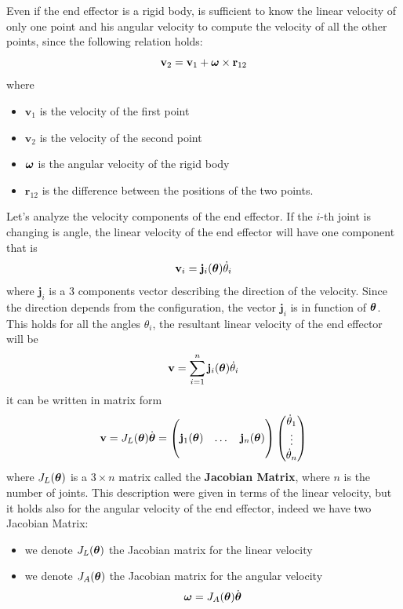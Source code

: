 \documentclass[10pt, letterpaper]{report}
\begin{document}
Even if the end effector is a rigid body, is sufficient to know the linear velocity of only one point and his angular velocity to compute the velocity of all the other points, since the following relation holds:\begin{equation}
    \mathbf v_2 = \mathbf v_1+{\boldsymbol{\omega}}\times \mathbf r_{12}
\end{equation}
where\begin{itemize}
    \item $\mathbf v_1$ is the velocity of the first point
    \item $\mathbf v_2$ is the velocity of the second point
    \item ${\boldsymbol{\omega}}$ is the angular velocity of the rigid body
    \item $\mathbf r_{12}$ is the difference between the positions of the two points.
\end{itemize}
Let's analyze the velocity components of the end effector. If the $i$-th joint is changing is angle, the linear velocity of the end effector will have one component that is\begin{equation}
    \mathbf v_i=\mathbf j_i({\boldsymbol{\theta}})\dot\theta_i
\end{equation}
where $\mathbf j_i$ is a 3 components vector describing the direction of the velocity.
Since the direction depends from the configuration, the vector $\mathbf j_i$ is in function of ${\boldsymbol{\theta}}$.
This holds for all the angles $\theta_i$, the resultant linear velocity of the end effector will be\begin{equation}
    \mathbf v=\sum_{i=1}^n\mathbf j_i({\boldsymbol{\theta}})\dot\theta_i
\end{equation}
it can be written in matrix form\begin{equation}
    \mathbf v = J_L({\boldsymbol{\theta}})\dot{{\boldsymbol{\theta}}}=\begin{pmatrix}
        &&\\
        \mathbf j_1({\boldsymbol{\theta}})&\dots&\mathbf j_n({\boldsymbol{\theta}})\\
        &&
    \end{pmatrix}\begin{pmatrix}
        \dot\theta_1\\\vdots\\\dot\theta_n
    \end{pmatrix}
\end{equation}
where $J_L({\boldsymbol{\theta}})$ is a $3\times n$ matrix called the \textbf{Jacobian Matrix}, where $n$ is the number of joints. This description were given in terms of the linear velocity, but it holds also for the angular velocity of the end effector, indeed we have two Jacobian Matrix:\begin{itemize}
    \item we denote $J_L({\boldsymbol{\theta}})$ the Jacobian matrix for the linear velocity
    \item we denote $J_A({\boldsymbol{\theta}})$ the Jacobian matrix for the angular velocity\begin{equation}
        {\boldsymbol{\omega}}=J_A({\boldsymbol{\theta}})\dot{{\boldsymbol{\theta}}}
    \end{equation}
\end{itemize}
\end{document}
